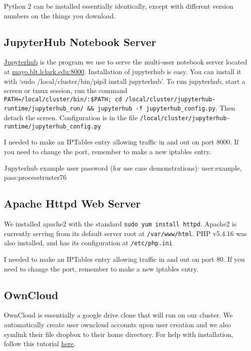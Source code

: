 \documentclass[]{book}
\begin{document}
Python 2 can be installed essentially identically, except with different
version numbers on the things you download.

\subsection{JupyterHub Notebook
Server}\label{jupyterhub-notebook-server}

\href{http://jupyterhub.readthedocs.io/en/latest/}{Jupyterhub} is the
program we use to serve the multi-user notebook server located at
\url{mayo.blt.lclark.edu:8000}. Installation of jupyterhub is easy. You
can install it with `sudo /local/cluster/bin/pip3 install jupyterhub'.
To run jupyterhub, start a screen or tmux session, run the command
\texttt{PATH=/local/cluster/bin/:\$PATH;\ cd\ /local/cluster/jupyterhub-runtime/jupyterhub\_run/\ \&\&\ jupyterhub\ -f\ jupyterhub\_config.py}.
Then detach the screen. Configuration is in the file
\texttt{/local/cluster/jupyterhub-runtime/jupyterhub\_config.py}

I needed to make an IPTables entry allowing traffic in and out on port
8000. If you need to change the port, remember to make a new iptables
entry.

Jupyterhub example user password (for use case demonstrations):
user:example, pass:processtruster76

\subsection{Apache Httpd Web Server}\label{apache-httpd-web-server}

We installed apache2 with the standard
\texttt{sudo\ yum\ install\ httpd}. Apache2 is currently serving from
its default server root at \texttt{/var/www/html}. PHP v5.4.16 was also
installed, and has its configuration at \texttt{/etc/php.ini}

I needed to make an IPTables entry allowing traffic in and out on port
80. If you need to change the port, remember to make a new iptables
entry.

\subsection{OwnCloud}\label{owncloud}

OwnCloud is essentially a google drive clone that will run on our
cluster. We automatically create user owncloud accounts upon user
creation and we also symlink their file dropbox to their home directory.
For help with installation, follow this tutorial
\href{https://www.digitalocean.com/community/tutorials/how-to-install-and-configure-owncloud-on-centos-7}{here}.
\end{document}
